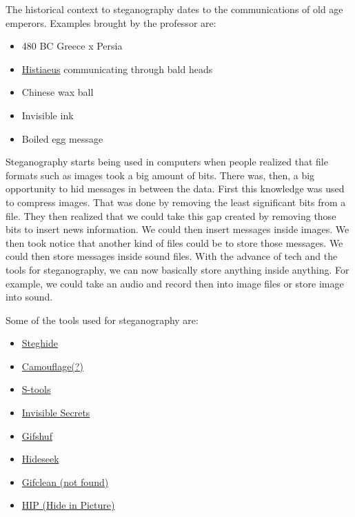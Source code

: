 \documentclass{article}
\begin{document}
The historical context to steganography dates to the communications of old age emperors. Examples brought by the professor are:
\begin{itemize}
      \item 480 BC Greece x Persia
      \item \href{https://en.wikipedia.org/wiki/Histiaeus}{Histiaeus} communicating through bald heads
      \item Chinese wax ball
      \item Invisible ink
      \item Boiled egg message
\end{itemize}

Steganography starts being used in computers when people realized that file formats such as images took a big amount of bits. There was, then, a big opportunity to hid messages in between the data. First this knowledge was used to compress images. That was done by removing the least significant bits from a file. They then realized that we could take this gap created by removing those bits to insert news information. We could then insert messages inside images. We then took notice that another kind of files could be to store those messages. We could then store messages inside sound files. With the advance of tech and the tools for steganography, we can now basically store anything inside anything. For example, we could take an audio and record then into image files or store image into sound.

Some of the tools used for steganography are:
\begin{itemize}
      \item \href{https://steghide.sourceforge.net/}{Steghide}
      \item \href{http://camouflage.unfiction.com/}{Camouflage(?)}
      \item \href{https://www.cs.vu.nl/~ast/books/mos2/zebras.html}{S-tools}
      \item \href{https://www.east-tec.com/invisiblesecrets/}{Invisible Secrets}
      \item \href{https://darkside.com.au/gifshuffle/}{Gifshuf}
      \item \href{https://trove.cyberskyline.com/38ce8b2db6a24bb49615382e2a252085}{Hideseek}
      \item \href{https://ieeexplore.ieee.org/document/10031438}{Gifclean (not found)}
      \item \href{https://sourceforge.net/projects/hide-in-picture/}{HIP (Hide in Picture)}
\end{itemize}
\end{document}

